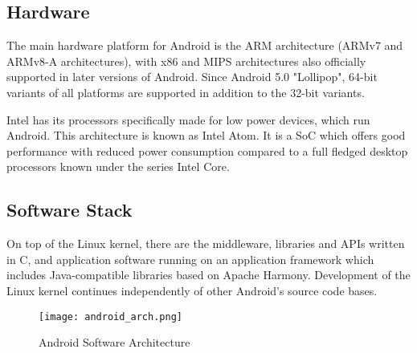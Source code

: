 \subsection {Hardware}

The main hardware platform for Android is the ARM architecture (ARMv7 and ARMv8-A architectures),
with x86 and MIPS architectures also officially supported in later versions of Android.
Since Android 5.0 "Lollipop", 64-bit variants of all platforms are supported in
addition to the 32-bit variants.

Intel has its processors specifically made for low power devices, which run Android.
This architecture is known as Intel Atom. It is a SoC which offers good performance with
reduced power consumption compared to a full fledged desktop processors known under
the series Intel Core.

\subsection{Software Stack}

On top of the Linux kernel, there are the middleware, libraries and APIs written in C,
and application software running on an application framework which includes
Java-compatible libraries based on Apache Harmony. Development of the Linux kernel
continues independently of other Android's source code bases.

\begin{figure}[h]
  \centering
    \centering
    \texttt{[image: android\_arch.png]}
    \caption{Android Software Architecture}
    \label{fig:android_arch}
\end{figure}




  
  

